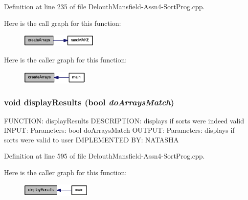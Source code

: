 Definition at line 235 of file DelouthMansfield-\/Assn4-\/SortProg.cpp.



Here is the call graph for this function:\nopagebreak
\begin{figure}[H]
\begin{center}
\leavevmode
\includegraphics[width=108pt]{_delouth_mansfield-_assn4-_sort_prog_8cpp_af209aad9d447548ca062515ab1acbe3c_cgraph}
\end{center}
\end{figure}




Here is the caller graph for this function:\nopagebreak
\begin{figure}[H]
\begin{center}
\leavevmode
\includegraphics[width=95pt]{_delouth_mansfield-_assn4-_sort_prog_8cpp_af209aad9d447548ca062515ab1acbe3c_icgraph}
\end{center}
\end{figure}


\hypertarget{_delouth_mansfield-_assn4-_sort_prog_8cpp_a6832ddb090d7bf6c3b962acac96e3951}{
\subsubsection[{displayResults}]{\setlength{\rightskip}{0pt plus 5cm}void displayResults (bool {\em doArraysMatch})}}
\label{_delouth_mansfield-_assn4-_sort_prog_8cpp_a6832ddb090d7bf6c3b962acac96e3951}
FUNCTION: displayResults DESCRIPTION: displays if sorts were indeed valid INPUT: Parameters: bool doArraysMatch OUTPUT: Parameters: displays if sorts were valid to user IMPLEMENTED BY: NATASHA 

Definition at line 595 of file DelouthMansfield-\/Assn4-\/SortProg.cpp.



Here is the caller graph for this function:\nopagebreak
\begin{figure}[H]
\begin{center}
\leavevmode
\includegraphics[width=99pt]{_delouth_mansfield-_assn4-_sort_prog_8cpp_a6832ddb090d7bf6c3b962acac96e3951_icgraph}
\end{center}
\end{figure}


